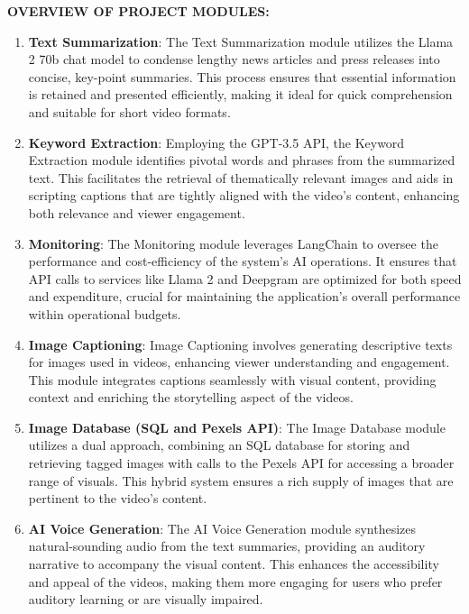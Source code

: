 \documentclass[12pt]{article}
\begin{document}
\justify \textbf{\fontsize{12}{12} OVERVIEW OF PROJECT MODULES: }

\begin{enumerate}
    \item \textbf{Text Summarization}: The Text Summarization module utilizes the Llama 2 70b chat model to condense lengthy news articles and press releases into concise, key-point summaries. This process ensures that essential information is retained and presented efficiently, making it ideal for quick comprehension and suitable for short video formats.
    
    \item \textbf{Keyword Extraction}: Employing the GPT-3.5 API, the Keyword Extraction module identifies pivotal words and phrases from the summarized text. This facilitates the retrieval of thematically relevant images and aids in scripting captions that are tightly aligned with the video’s content, enhancing both relevance and viewer engagement.
    
    \item \textbf{Monitoring}: The Monitoring module leverages LangChain to oversee the performance and cost-efficiency of the system's AI operations. It ensures that API calls to services like Llama 2 and Deepgram are optimized for both speed and expenditure, crucial for maintaining the application's overall performance within operational budgets.
    
    \item \textbf{Image Captioning}: Image Captioning involves generating descriptive texts for images used in videos, enhancing viewer understanding and engagement. This module integrates captions seamlessly with visual content, providing context and enriching the storytelling aspect of the videos.
    
    \item \textbf{Image Database (SQL and Pexels API)}: The Image Database module utilizes a dual approach, combining an SQL database for storing and retrieving tagged images with calls to the Pexels API for accessing a broader range of visuals. This hybrid system ensures a rich supply of images that are pertinent to the video’s content.
    
    \item \textbf{AI Voice Generation}: The AI Voice Generation module synthesizes natural-sounding audio from the text summaries, providing an auditory narrative to accompany the visual content. This enhances the accessibility and appeal of the videos, making them more engaging for users who prefer auditory learning or are visually impaired.
    

\end{enumerate}
\end{document}
